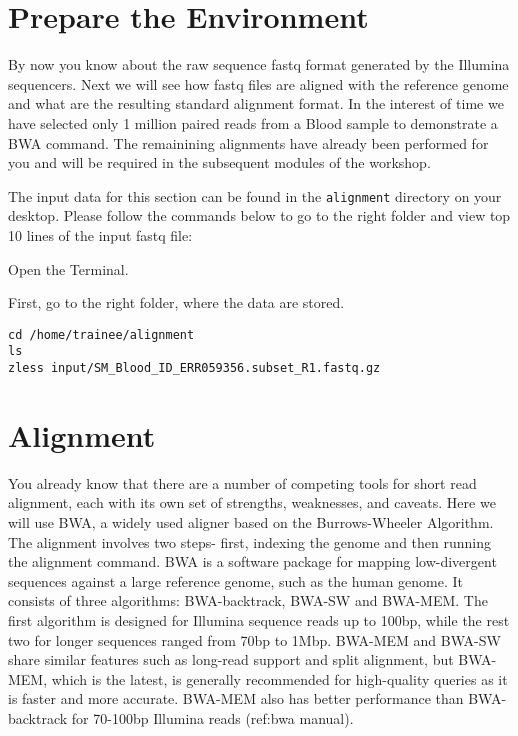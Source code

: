 \section{Prepare the Environment}

\begin{information}
By now you know about the raw sequence fastq format generated by the Illumina sequencers. Next we will see how fastq files are aligned with the reference genome and what are the resulting standard alignment format. 
In the interest of time we have selected only 1 million paired reads from a Blood sample to demonstrate a BWA command. The remainining alignments have already been performed for you and will be required in the subsequent modules of the workshop.

The input data for this section can be found in the \texttt{alignment}
directory on your desktop. Please follow the commands below to go to the right folder and view top 10 lines of the input fastq file:
\end{information}

\begin{steps}
Open the Terminal.

First, go to the right folder, where the data are stored.
\begin{lstlisting}
cd /home/trainee/alignment
ls
zless input/SM_Blood_ID_ERR059356.subset_R1.fastq.gz
\end{lstlisting}

\end{steps}

\section{Alignment}

\begin{information}
You already know that there are a number of competing tools for short read alignment, each with its own set of strengths, weaknesses, and caveats. Here we will use BWA, a widely used aligner based on the Burrows-Wheeler Algorithm.  The alignment involves two steps- first, indexing the genome and then running the alignment command.  
BWA is a software package for mapping low-divergent sequences against a large reference genome, such as the human genome. It consists of three algorithms: BWA-backtrack, BWA-SW and BWA-MEM. The first algorithm is designed for Illumina sequence reads up to 100bp, while the rest two for longer sequences ranged from 70bp to 1Mbp. BWA-MEM and BWA-SW share similar features such as long-read support and split alignment, but BWA-MEM, which is the latest, is generally recommended for high-quality queries as it is faster and more accurate. BWA-MEM also has better performance than BWA-backtrack for 70-100bp Illumina reads (ref:bwa manual).
\end{information}

